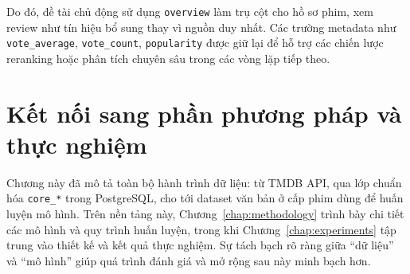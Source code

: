 Do đó, đề tài chủ động sử dụng \texttt{overview} làm trụ cột cho hồ sơ phim, xem review như tín hiệu bổ sung thay vì nguồn duy nhất. Các trường metadata như \texttt{vote\_average}, \texttt{vote\_count}, \texttt{popularity} được giữ lại để hỗ trợ các chiến lược reranking hoặc phân tích chuyên sâu trong các vòng lặp tiếp theo.

\section{Kết nối sang phần phương pháp và thực nghiệm}
Chương này đã mô tả toàn bộ hành trình dữ liệu: từ TMDB API, qua lớp chuẩn hóa \texttt{core\_*} trong PostgreSQL, cho tới dataset văn bản ở cấp phim dùng để huấn luyện mô hình. Trên nền tảng này, Chương~\ref{chap:methodology} trình bày chi tiết các mô hình và quy trình huấn luyện, trong khi Chương~\ref{chap:experiments} tập trung vào thiết kế và kết quả thực nghiệm. Sự tách bạch rõ ràng giữa “dữ liệu” và “mô hình” giúp quá trình đánh giá và mở rộng sau này minh bạch hơn.

